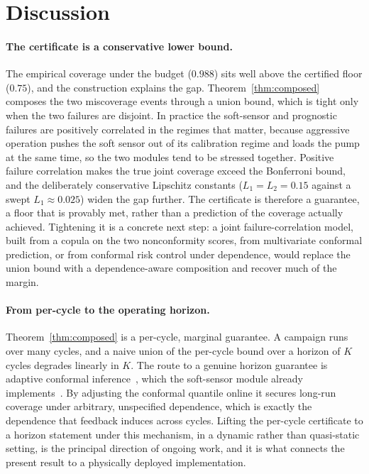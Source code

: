 \section{Discussion}
\label{sec:discussion}

\paragraph{The certificate is a conservative lower bound.}
The empirical coverage under the budget ($0.988$) sits well above the certified floor
($0.75$), and the construction explains the gap. Theorem~\ref{thm:composed} composes the
two miscoverage events through a union bound, which is tight only when the two failures
are disjoint. In practice the soft-sensor and prognostic failures are positively
correlated in the regimes that matter, because aggressive operation pushes the soft
sensor out of its calibration regime and loads the pump at the same time, so the two
modules tend to be stressed together. Positive failure correlation makes the true joint
coverage exceed the Bonferroni bound, and the deliberately conservative Lipschitz
constants ($L_1=L_2=0.15$ against a swept $L_1\approx0.025$) widen the gap further. The
certificate is therefore a guarantee, a floor that is provably met, rather than a
prediction of the coverage actually achieved. Tightening it is a concrete next step: a
joint failure-correlation model, built from a copula on the two nonconformity scores,
from multivariate conformal prediction, or from conformal risk control under dependence,
would replace the union bound with a dependence-aware composition and recover much of the
margin.

\paragraph{From per-cycle to the operating horizon.}
Theorem~\ref{thm:composed} is a per-cycle, marginal guarantee. A campaign runs over many
cycles, and a naive union of the per-cycle bound over a horizon of $K$ cycles degrades
linearly in $K$. The route to a genuine horizon guarantee is adaptive conformal
inference~\citep{gibbs2021}, which the soft-sensor module already
implements~\citep{busico_m1}. By adjusting the conformal quantile online it secures
long-run coverage under arbitrary, unspecified dependence, which is exactly the
dependence that feedback induces across cycles. Lifting the per-cycle certificate to a
horizon statement under this mechanism, in a dynamic rather than quasi-static setting, is
the principal direction of ongoing work, and it is what connects the present result to a
physically deployed implementation.

